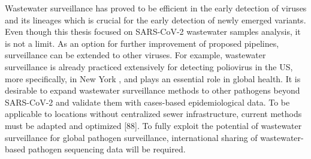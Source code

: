 Wastewater surveillance has proved to be efficient in the early detection of viruses and its lineages which is crucial for the early detection of newly emerged variants. Even though this thesis focused on SARS-CoV-2 wastewater samples analysis, it is not a limit. As an option for further improvement of proposed pipelines, surveillance can be extended to other viruses. For example, wastewater surveillance is already practiced extensively for detecting poliovirus in the US, more specifically, in New York \cite{russo2022}, and plays an essential role in global health. It is desirable to expand wastewater surveillance methods to other pathogens beyond SARS-CoV-2 and validate them with cases-based epidemiological data. To be applicable to locations without centralized sewer infrastructure, current methods must be adapted and optimized [88]. To fully exploit the potential of wastewater surveillance for global pathogen surveillance, international sharing of wastewater-based pathogen sequencing data will be required.

\clearpage

